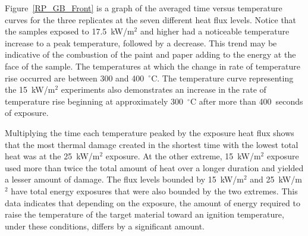 \documentclass[twoside]{uocthesis}
\begin{document}
{Figure~\ref{RP_GB_Front} is a graph of the averaged time versus temperature curves for the three replicates at the seven different heat flux levels.  Notice that the samples exposed to 17.5~kW/m$^2$ and higher had a noticeable temperature increase to a peak temperature, followed by a decrease.  This trend may be indicative of the combustion of the paint and paper adding to the energy at the face of the sample. The temperatures at which the change in rate of temperature rise occurred are between 300 and 400~$^{\circ}$C.  The temperature curve representing the 15~kW/m$^2$ experiments also demonstrates an increase in the rate of temperature rise beginning at approximately 300~$^{\circ}$C after more than 400~seconds of exposure.  

Multiplying the time each temperature peaked by the exposure heat flux shows that the most thermal damage created in the shortest time with the lowest total heat was at the 25~kW/m$^2$ exposure.  At the other extreme, 15~kW/m$^2$ exposure used more than twice the total amount of heat over a longer duration and yielded a lesser amount of damage.  The flux levels bounded by 15~kW/m$^2$ and 25~kW/m$^2$ have total energy exposures that were also bounded by the two extremes. This data indicates that depending on the exposure, the amount of energy required to raise the temperature of the target material toward an ignition temperature, under these conditions, differs by a significant amount.        
  
}
\end{document}
